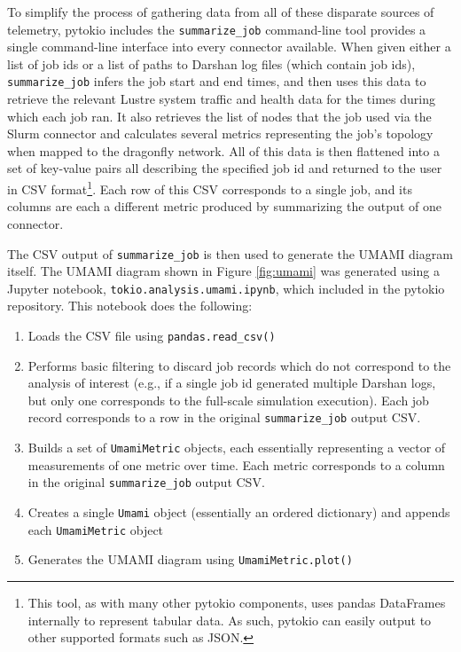 To simplify the process of gathering data from all of these disparate sources of telemetry, pytokio includes the \texttt{summarize\_job} command-line tool provides a single command-line interface into every connector available.
When given either a list of job ids or a list of paths to Darshan log files (which contain job ids), \texttt{summarize\_job} infers the job start and end times, and then uses this data to retrieve the relevant Lustre system traffic and health data for the times during which each job ran.
It also retrieves the list of nodes that the job used via the Slurm connector and calculates several metrics representing the job's topology when mapped to the dragonfly network.
All of this data is then flattened into a set of key-value pairs all describing the specified job id and returned to the user in CSV format\footnote{This tool, as with many other pytokio components, uses pandas DataFrames internally to represent tabular data.  As such, pytokio can easily output to other supported formats such as JSON.}.
Each row of this CSV corresponds to a single job, and its columns are each a different metric produced by summarizing the output of one connector.

The CSV output of \texttt{summarize\_job} is then used to generate the UMAMI diagram itself.
The UMAMI diagram shown in Figure \ref{fig:umami} was generated using a Jupyter notebook, \texttt{tokio.analysis.umami.ipynb}, which included in the pytokio repository.
This notebook does the following:

\begin{enumerate}[leftmargin=*]
\item Loads the CSV file using \texttt{pandas.read\_csv()}
\item Performs basic filtering to discard job records which do not correspond to the analysis of interest (e.g., if a single job id generated multiple Darshan logs, but only one corresponds to the full-scale simulation execution).  Each job record corresponds to a row in the original \texttt{summarize\_job} output CSV.
\item Builds a set of \texttt{UmamiMetric} objects, each essentially representing a vector of measurements of one metric over time.  Each metric corresponds to a column in the original \texttt{summarize\_job} output CSV.
\item Creates a single \texttt{Umami} object (essentially an ordered dictionary) and appends each \texttt{UmamiMetric} object
\item Generates the UMAMI diagram using \texttt{UmamiMetric.plot()}
\end{enumerate}


